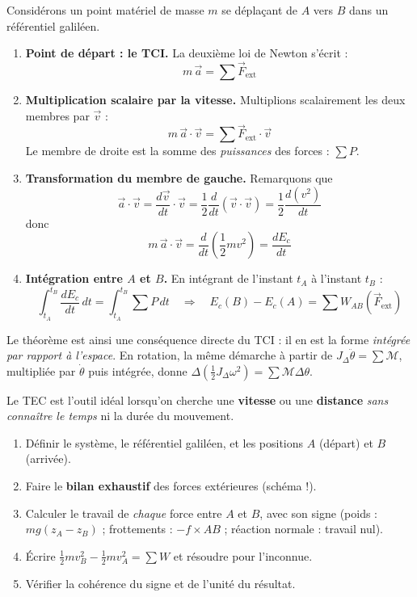\documentclass[11pt]{article}
\begin{document}
\begin{experience}
Considérons un point matériel de masse $m$ se déplaçant de $A$ vers $B$ dans un référentiel galiléen.
\begin{enumerate}
\item \textbf{Point de départ : le TCI.} La deuxième loi de Newton s'écrit :
\[ m\,\vec{a} = \sum \vec{F}_{\mathrm{ext}} \]
\item \textbf{Multiplication scalaire par la vitesse.} Multiplions scalairement les deux membres par $\vec{v}$ :
\[ m\,\vec{a}\cdot\vec{v} = \sum \vec{F}_{\mathrm{ext}}\cdot\vec{v} \]
Le membre de droite est la somme des \emph{puissances} des forces : $\sum P$.
\item \textbf{Transformation du membre de gauche.} Remarquons que
\[ \vec{a}\cdot\vec{v} = \frac{d\vec{v}}{dt}\cdot\vec{v} = \frac{1}{2}\frac{d}{dt}\left(\vec{v}\cdot\vec{v}\right) = \frac{1}{2}\frac{d(v^2)}{dt} \]
donc
\[ m\,\vec{a}\cdot\vec{v} = \frac{d}{dt}\left(\frac{1}{2}m v^2\right) = \frac{dE_c}{dt} \]
\item \textbf{Intégration entre $A$ et $B$.} En intégrant de l'instant $t_A$ à l'instant $t_B$ :
\[ \int_{t_A}^{t_B}\frac{dE_c}{dt}\,dt = \int_{t_A}^{t_B} \sum P\,dt \quad\Longrightarrow\quad E_c(B)-E_c(A) = \sum W_{AB}(\vec{F}_{\mathrm{ext}}) \]
\end{enumerate}
Le théorème est ainsi une conséquence directe du TCI : il en est la forme \emph{intégrée par rapport à l'espace}. En rotation, la même démarche à partir de $J_\Delta\ddot{\theta} = \sum\mathcal{M}$, multipliée par $\dot{\theta}$ puis intégrée, donne $\Delta(\tfrac12 J_\Delta\omega^2) = \sum \mathcal{M}\Delta\theta$.
\end{experience}

\begin{methode}
Le TEC est l'outil idéal lorsqu'on cherche une \textbf{vitesse} ou une \textbf{distance} \emph{sans connaître le temps} ni la durée du mouvement.
\begin{enumerate}
\item Définir le système, le référentiel galiléen, et les positions $A$ (départ) et $B$ (arrivée).
\item Faire le \textbf{bilan exhaustif} des forces extérieures (schéma !).
\item Calculer le travail de \emph{chaque} force entre $A$ et $B$, avec son signe (poids : $mg(z_A-z_B)$ ; frottements : $-f \times AB$ ; réaction normale : travail nul).
\item Écrire $\frac12 m v_B^2 - \frac12 m v_A^2 = \sum W$ et résoudre pour l'inconnue.
\item Vérifier la cohérence du signe et de l'unité du résultat.
\end{enumerate}
\end{methode}
\end{document}
